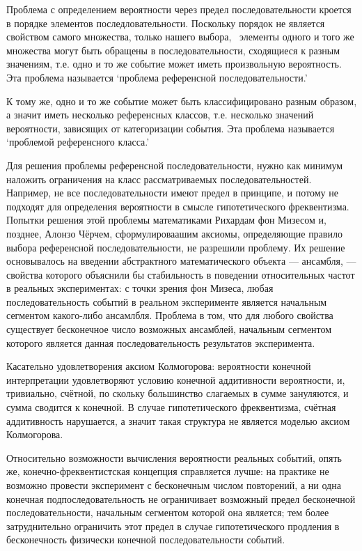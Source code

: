 \documentclass[14pt, a4paper, pdftex]{extarticle}
\begin{document}
Проблема с определением вероятности через предел последовательности кроется в порядке элементов последловательности. Поскольку порядок не является свойством самого множества, только нашего выбора,~\cite{Russell} элементы одного и того же множества могут быть обращены в последовательности, сходящиеся к разным значениям, т.е. одно и то же событие может иметь произвольную вероятность. Эта проблема называется `проблема референсной последовательности.'

К тому же, одно и то же событие может быть классифицировано разным образом, а значит иметь несколько референсных классов, т.е. несколько значений вероятности, зависящих от категоризации события. Эта проблема называется `проблемой референсного класса.'

Для решения проблемы референсной последовательности, нужно как минимум наложить ограничения на класс рассматриваемых последовательностей. Например, не все последовательности имеют предел в принципе, и потому не подходят для определения вероятности в смысле гипотетического фреквентизма. Попытки решения этой проблемы математиками Рихардам фон Мизесом и, позднее, Алонзо Чёрчем, сформулироваашим аксиомы, определяющие правило выбора референсной последовательности, не разрешили проблему. Их решение основывалось на введении абстрактного математического объекта --- ансамбля, --- свойства которого объяснили бы стабильность в поведении относительных частот в реальных экспериментах: с точки зрения фон Мизеса, любая последовательность событий в реальном эксперименте является начальным сегментом какого-либо ансамлбля. Проблема в том, что для любого свойства существует бесконечное число возможных ансамблей, начальным сегментом которого является данная последовательность результатов эксперимента.


Касательно удовлетворения аксиом Колмогорова: вероятности конечной интерпретации удовлетворяют условию конечной аддитивности вероятности, и, тривиально, счётной, по скольку большинство слагаемых в сумме зануляются, и сумма сводится к конечной. В случае гипотетического фреквентизма, счётная аддитивность нарушается, а значит такая структура не является моделью аксиом Колмогорова.

Относительно возможности вычисления вероятности реальных событий, опять же, конечно-фреквентистская концепция справляется лучше: на практике не возможно провести эксперимент с бесконечным числом повторений, а ни одна конечная подпоследовательность не ограничивает возможный предел бесконечной последовательности, начальным сегментом которой она является; тем более затруднительно ограничить этот предел в случае гипотетического продления в бесконечность физически конечной последовательности событий.
\end{document}
